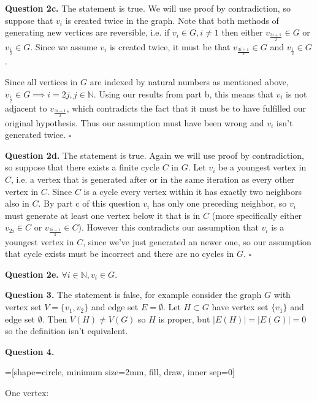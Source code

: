 \documentclass[letterpaper, reqno,11pt]{article}
\begin{document}
{\medskip\noindent\bf Question 2c.} The statement is true. We will use proof by contradiction, so suppose that $v_i$ is created twice in the graph. Note that both methods of generating new vertices are reversible, i.e. if $v_i\in G, i\neq 1$ then either $v_{\frac{3i+1}{2}}\in G$ or $v_{\frac{i}{2}}\in G$. Since we assume $v_i$ is created twice, it must be that $v_{\frac{3i+1}{2}}\in G$ and $v_{\frac{i}{2}}\in G$. 

Since all vertices in $G$ are indexed by natural numbers as mentioned above, $v_{\frac{i}{2}}\in G \implies i=2j, j\in\mathbb{N}$. Using our results from part b, this means that $v_i$ is not adjacent to $v_{\frac{3i+1}{2}}$, which contradicts the fact that it must be to have fulfilled our original hypothesis. Thus our assumption must have been wrong and $v_i$ isn't generated twice. $\square$

{\medskip\noindent\bf Question 2d.} The statement is true. Again we will use proof by contradiction, so suppose that there exists a finite cycle $C$ in $G$. Let $v_i$ be a youngest vertex in $C$, i.e. a vertex that is generated after or in the same iteration as every other vertex in $C$. Since $C$ is a cycle every vertex within it has exactly two neighbors also in $C$. By part c of this question $v_i$ has only one preceding neighbor, so $v_i$ must generate at least one vertex below it that is in $C$ (more specifically either $v_{2i}\in C$ or $v_{\frac{2i-1}{3}}\in C$). However this contradicts our assumption that $v_i$ is a youngest vertex in $C$, since we've just generated an newer one, so our assumption that cycle exists must be incorrect and there are no cycles in $G$. $\square$

{\medskip\noindent\bf Question 2e.} $\forall i\in\mathbb{N}, v_i\in G$. 

{\medskip\noindent\bf Question 3.} The statement is false, for example consider the graph $G$ with vertex set $V=\{v_1, v_2\}$ and edge set $E=\emptyset$. Let $H\subset G$ have vertex set $\{v_1\}$ and edge set $\emptyset$. Then  $V(H)\neq V(G)$ so $H$ is proper, but $\left| E(H) \right| =\left| E(G) \right| =0$ so the definition isn't equivalent. 

{\medskip\noindent\bf Question 4.} 

=[shape=circle, minimum size=2mm, fill, draw, inner sep=0]

One vertex:

\begin{center}
\end{center}
\end{document}
